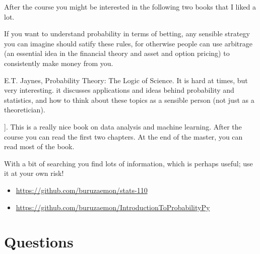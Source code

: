 \documentclass[a4paper]{article}
\theoremstyle{definition}
\newcommand{\given}{\,\middle|\,}
\renewcommand{\P}[1]{\,\mathsf{P}\left[#1\right]}
\newcommand{\1}[1]{\,I_{#1}} %
\begin{document}
After the course you might be interested in the following two books that I liked a lot. 
If you want to understand probability in terms of betting, any sensible strategy you can imagine should satify   these rules, for otherwise people can use arbitrage (an essential idea in the financial theory and asset and option pricing) to consistently make  money from you.
\item E.T. Jaynes, Probability Theory: The Logic of Science. It is hard at times, but very interesting. it discusses  applications and ideas behind probability and statistics, and how to think about these topics as a sensible person (not just as a theoretician).
\item\relax [[
\end{enumerate}
\url{https://www.microsoft.com/en-us/research/uploads/prod/2006/01/Bishop-Pattern-Recognition-and-Machine-Learning-2006.pdf}][C. Bishop, Pattern Recognition and Machine Learning]]. This is a really nice book on data analysis and  machine learning. After the course you can read the first two chapters. At the end of the master, you can read most of the book. 


With a bit of searching you find lots of information, which is perhaps  useful;  use it at your own risk!

\begin{itemize}
\item \url{https://github.com/buruzaemon/stats-110}
\item \url{https://github.com/buruzaemon/IntroductionToProbabilityPy}
\end{itemize}





\section{Questions}
\label{sec:org464a596}
\end{document}
